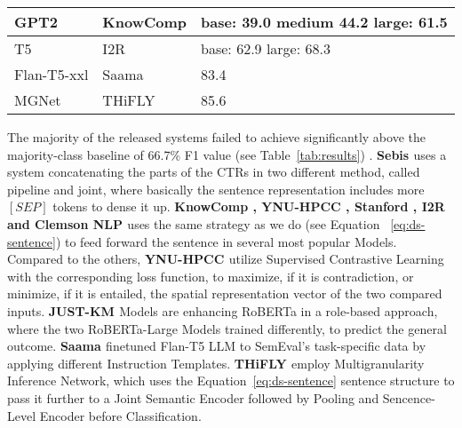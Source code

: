 \begin{table}[!h]
{\begin{tabular}{|l||l|l|}
    GPT2             & \cite{wang_knowcomp_2023}KnowComp                                                             & base: 39.0 medium 44.2 large: 61.5                                                       \\ \hline
    T5               & \cite{rajamanickam_i2r_2023}I2R                                                                  & base: 62.9 large: 68.3                                                                   \\ \hline
    Flan-T5-xxl      & \cite{kanakarajan_saama_2023}Saama                                                                & 83.4                                                                                     \\ \hline
    MGNet            & \cite{zhou_thifly_2023}THiFLY                                                               & 85.6                                                                                     \\ \hline
    \end{tabular}%
    }
\end{table}


The majority of the released systems failed to achieve significantly above the majority-class baseline of 66.7\%
F1 value (see Table~\ref{tab:results}) \cite{jullien_semeval-2023_nodate}.
\textbf{Sebis \cite{vladika_sebis_2023}} uses a system concatenating the parts of the CTRs in two different method, called pipeline and joint, 
where basically the sentence representation includes more $[SEP]$ tokens to dense it up.
\textbf{KnowComp \cite{wang_knowcomp_2023}, YNU-HPCC \cite{feng_ynu-hpcc_nodate}, Stanford \cite{takehana_stanford_2023}, I2R \cite{rajamanickam_i2r_2023} and Clemson NLP \cite{alameldin_clemson_nodate}} uses the same strategy as we do (see Equation ~\ref{eq:ds-sentence}) to feed forward the sentence in several most popular Models.
Compared to the others, \textbf{YNU-HPCC \cite{feng_ynu-hpcc_nodate}} utilize Supervised Contrastive Learning with the corresponding loss function, 
to maximize, if it is contradiction, or minimize, if it is entailed, the spatial representation vector of the two compared inputs.
\textbf{JUST-KM \cite{alissa_just-km_2023}} Models are enhancing RoBERTa in a role-based approach, where the two RoBERTa-Large Models trained differently, 
to predict the general outcome.
\textbf{Saama \cite{kanakarajan_saama_2023}} finetuned Flan-T5 LLM to SemEval's task-specific data by applying different Instruction Templates. 
\textbf{THiFLY \cite{zhou_thifly_2023}} employ Multigranularity Inference Network, which uses the Equation~\ref{eq:ds-sentence} sentence structure to pass
it further to a Joint Semantic Encoder followed by Pooling and Sencence-Level Encoder before Classification.


